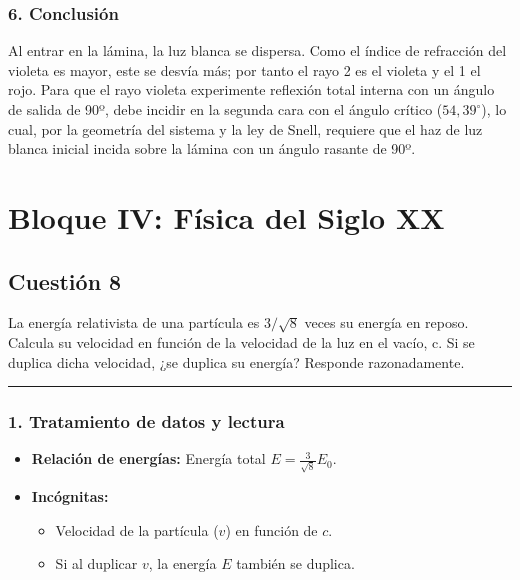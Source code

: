 \subsubsection*{6. Conclusión}
\begin{cajaconclusion}
Al entrar en la lámina, la luz blanca se dispersa. Como el índice de refracción del violeta es mayor, este se desvía más; por tanto el rayo 2 es el violeta y el 1 el rojo. Para que el rayo violeta experimente reflexión total interna con un ángulo de salida de 90º, debe incidir en la segunda cara con el ángulo crítico ($54,39^\circ$), lo cual, por la geometría del sistema y la ley de Snell, requiere que el haz de luz blanca inicial incida sobre la lámina con un ángulo rasante de 90º.
\end{cajaconclusion}
\newpage
\section{Bloque IV: Física del Siglo XX}
\label{sec:xx_2020_jul_ext}

\subsection{Cuestión 8}
\label{subsec:C8_2020_jul_ext_b}

\begin{cajaenunciado}
La energía relativista de una partícula es $3/\sqrt{8}$ veces su energía en reposo. Calcula su velocidad en función de la velocidad de la luz en el vacío, c. Si se duplica dicha velocidad, ¿se duplica su energía? Responde razonadamente.
\end{cajaenunciado}
\hrule

\subsubsection*{1. Tratamiento de datos y lectura}
\begin{itemize}
    \item \textbf{Relación de energías:} Energía total $E = \frac{3}{\sqrt{8}} E_0$.
    \item \textbf{Incógnitas:}
    \begin{itemize}
        \item Velocidad de la partícula ($v$) en función de $c$.
        \item Si al duplicar $v$, la energía $E$ también se duplica.
    \end{itemize}
\end{itemize}

